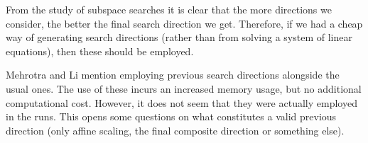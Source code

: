 

\begin{remark}
From the study of subspace searches it is clear that the more 
directions we consider, the better the final search direction 
we get. Therefore, if we had a cheap way of generating search
directions (rather than from solving a system of linear equations),
then these should be employed.
\end{remark}

\begin{remark}
Mehrotra and Li \cite{MehrotraLi} mention employing previous search
directions alongside the usual ones. The use of these incurs an
increased memory usage, but no additional computational cost.
However, it does not seem that they were actually employed in
the runs. This opens some questions on what constitutes a valid
previous direction (only affine scaling, the final composite direction
or something else).
\end{remark}

